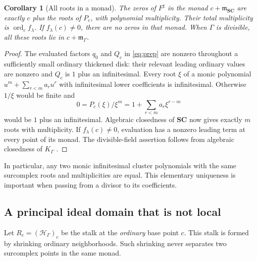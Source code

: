 \documentclass[11pt,letterpaper]{article}
\newtheorem{corollary}[corollary]{Corollary}
\theoremstyle{definition}
\theoremstyle{remark}
\newcommand{\SC}{\mathbf{SC}}
\newcommand{\HH}{\mathscr H_\Gamma}
\newcommand{\KK}{K_\Gamma}
\newcommand{\mm}{\mathfrak m_\Gamma}
\newcommand{\sh}{^{\sharp}}
\newcommand{\ord}{\operatorname{ord}}
\numberwithin{equation}{section}
\begin{document}
\begin{corollary}[All roots in a monad]\label{cor:roots}
The zeros of $F\sh$ in the monad $c+\mathfrak m_{\SC}$ are exactly $c$ plus the roots of $P_c$, with polynomial multiplicity. Their total multiplicity is $\ord_c f_\lambda$. If $f_\lambda(c)\ne0$, there are no zeros in that monad. When $\Gamma$ is divisible, all these roots lie in $c+\mm$.
\end{corollary}
\begin{proof}
The evaluated factors $q_0$ and $Q_c$ in \eqref{eq:prep} are nonzero throughout a sufficiently small ordinary thickened disk: their relevant leading ordinary values are nonzero and $Q_c$ is $1$ plus an infinitesimal. Every root $\xi$ of a monic polynomial $u^m+\sum_{r<m}a_ru^r$ with infinitesimal lower coefficients is infinitesimal. Otherwise $1/\xi$ would be finite and
\[
 0=P_c(\xi)/\xi^m=1+\sum_{r<m}a_r\xi^{r-m}
\]
would be $1$ plus an infinitesimal. Algebraic closedness of $\SC$ now gives exactly $m$ roots with multiplicity. If $f_\lambda(c)\ne0$, evaluation has a nonzero leading term at every point of its monad. The divisible-field assertion follows from algebraic closedness of $\KK$ \cite[Corollary 4]{Poonen}.
\end{proof}
In particular, any two monic infinitesimal cluster polynomials with the same surcomplex roots and multiplicities are equal. This elementary uniqueness is important when passing from a divisor to its coefficients.

\subsection{A principal ideal domain that is not local}
Let $R_c=(\HH)_c$ be the stalk at the \emph{ordinary} base point $c$. This stalk is formed by shrinking ordinary neighborhoods. Such shrinking never separates two surcomplex points in the same monad.
\end{document}
